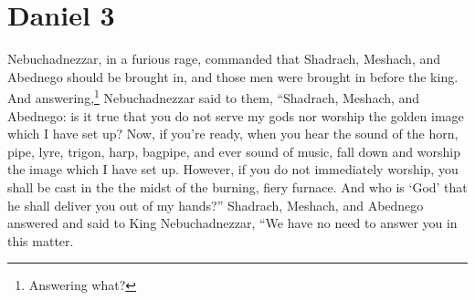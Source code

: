 \section{Daniel 3}\label{Daniel 3}
\begin{enumerate}[align=center]
     Nebuchadnezzar, in a furious rage, commanded that Shadrach, Meshach, and Abednego should be brought in, and those men were brought in before the king.%
     And answering,\footnote{Answering what?} Nebuchadnezzar said to them, ``Shadrach, Meshach, and Abednego: is it true that you do not serve my gods nor worship the golden image which I have set up?%
     Now, if you're ready, when you hear the sound of the horn, pipe, lyre, trigon, harp, bagpipe, and ever sound of music, fall down and worship the image which I have set up. However, if you do not immediately worship, you shall be cast in the the midst of the burning, fiery furnace. And who is `God' that he shall deliver you out of my hands?''%
     Shadrach, Meshach, and Abednego answered and said to King Nebuchadnezzar, ``We have no need to answer you in this matter.%
\end{enumerate}
